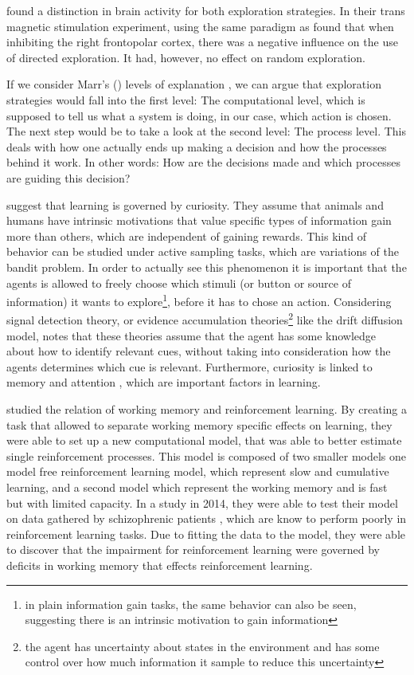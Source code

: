 \cite{zajkowski2017causal} found a distinction in brain activity for both exploration strategies. In their trans magnetic stimulation experiment, using the same paradigm as \cite{wilson2014humans} found that when inhibiting the right frontopolar cortex, there was a negative influence on the use of directed exploration. It had, however, no effect on random exploration.

If we consider Marr's (\citeyear{marr1976understanding}) levels of explanation , we can argue that exploration strategies would fall into the first level: The computational level, which is supposed to tell us what a system is doing, in our case, which action is chosen. The next step would be to take a look at the second level: The process level. This deals with how one actually ends up making a decision and how the processes behind it work. In other words: How are the decisions made and which processes are guiding this decision?  %

\cite{gottlieb2018towards} suggest that learning is governed by curiosity. They assume that animals and humans have intrinsic motivations that value specific types of information gain more than others, which are independent of gaining rewards. This kind of behavior can be studied under active sampling tasks, which are variations of the bandit problem. In order to actually see this phenomenon it is important that the agents is allowed to freely choose which stimuli (or button or source of information) it wants to explore\footnote{in plain information gain tasks, the same behavior can also be seen, suggesting there is an intrinsic motivation to gain information}, before it has to chose an action. 
Considering signal detection theory, or evidence accumulation theories\footnote{the agent has uncertainty about states in the environment and has some control over how much information it sample to reduce this uncertainty} like the drift diffusion model, \cite{gottlieb2018towards} notes that these theories assume that the agent has some knowledge about how to identify relevant cues, without taking into consideration how the agents determines which cue is relevant. 
Furthermore, curiosity is linked to memory \citep{gruber2014states, kang2009wick} and attention \citep{jepma2012neural}, which are important factors in learning.


\cite{collins2012much} studied the relation of working memory and reinforcement learning. By creating a task that allowed to separate working memory specific effects on learning, they were able to set up a new computational model, that was able to better estimate single reinforcement processes. This model is composed of two smaller models one model free reinforcement learning model, which represent slow and cumulative learning, and a second model which represent the working memory and is fast but with limited capacity. In a study in 2014, they were able to test their model on data gathered by schizophrenic patients \citep{collins2014working}, which are know to perform poorly in reinforcement learning tasks. Due to fitting the data to the model, they were able to discover that the impairment for reinforcement learning were governed by deficits in working memory that effects reinforcement learning. 


